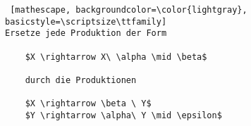 \documentclass[
    border=0.2cm,
    convert={density=600}
]{standalone}
\begin{document}

\begin{lstlisting} [mathescape, backgroundcolor=\color{lightgray},
basicstyle=\scriptsize\ttfamily]
Ersetze jede Produktion der Form

    $X \rightarrow X\ \alpha \mid \beta$

    durch die Produktionen

    $X \rightarrow \beta \ Y$
    $Y \rightarrow \alpha\ Y \mid \epsilon$
\end{lstlisting}
\end{document}
